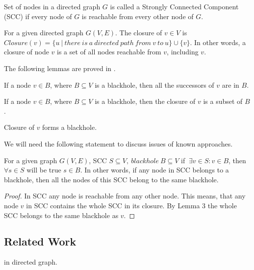 \documentclass{svproc}
\begin{document}
\begin{definition}
Set of nodes in a directed graph $G$ is called a Strongly Connected Component (SCC) if every node of $G$ is reachable from every other node of $G$.
\end{definition}

\begin{definition}
For a given directed graph $G(V,E)$. The closure of $v \in V$ is $Closure(v) = \{u\ |\ there\ is\ a\ directed\ path\ from\ v\ to\ u\} \cup \{v\}$.
In other words, a closure of node $v$ is a set of all nodes reachable from $v$, including $v$.
\end{definition}

The following lemmas are proved in \cite{li2010detecting}.

\begin{lemma}
If a node $v \in B$, where $B \subseteq V$ is a blackhole, then all the successors of $v$ are in $B$.
\end{lemma}

\begin{lemma}
If a node $v \in B$, where $B \subseteq V$ is a blackhole, then the closure of $v$ is a subset of $B$.
\end{lemma}

\begin{lemma}
Closure of $v$ forms a blackhole.
\end{lemma}

We will need the following statement to discuss issues of known approaches.
\begin{lemma}
For a given graph $G(V,E)$, SCC $S \subseteq V,\ blackhole\ B \subseteq V$ if $\ \exists v \in S: v \in B$,  then $\forall s \in S$ will be true $s \in B$.
In other words, if any node in SCC belongs to a blackhole, then all the nodes of this SCC belong to the same blackhole.
\end{lemma}
\begin{proof}
    In SCC any node is reachable from any other node. This means, that any node $v$ in SCC contains the whole SCC in its closure. By Lemma 3 the whole SCC belongs to the same blackhole as $v$. 
\end{proof}

\subsection{Related Work}

in directed graph.
\end{document}
